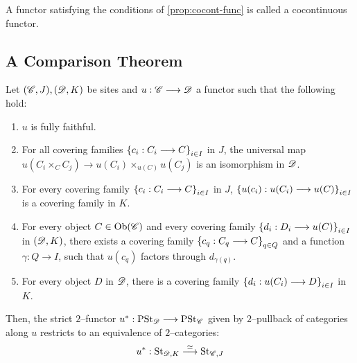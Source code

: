 \documentclass[11pt]{amsart}
\begin{document}
\begin{defn}
A functor satisfying the conditions of \cref{prop:cocont-func} is called a cocontinuous functor.
\end{defn}

\subsection{A Comparison Theorem}
\label{subsec:comp-thm}

\begin{thm}\label{thm:comp-thm}
Let $(\mathscr{C}, J), (\mathscr{D}, K)$ be sites and $u : \sC \to \sD$ a functor such that
the following hold:
\begin{enumerate}
\item $u$ is fully faithful.

\item For all covering families $\set{c_i : C_i \to C}_{i \in I}$ in $J$, the universal map
$u(C_i \times_C C_j) \to u(C_i) \times_{u(C)} u(C_j)$ is an isomorphism in $\mathscr{D}$.

\item For every covering family $\set{c_i : C_i \to C}_{i \in I}$ in $J$,
$\set{u(c_i) : u(C_i) \to u(C)}_{i \in I}$ is a covering family in $K$.

\item For every object $C \in \Ob{\sC}$ and every covering family
$\set{d_i : D_i \to u(C)}_{i \in I}$ in $(\mathscr{D}, K)$,
there exists a covering family $\set{c_q : C_q \to C}_{q \in Q}$ and a function
$\gamma : Q \to I$, such that $u(c_q)$ factors through $d_{\gamma(q)}$.

\item For every object $D$ in $\mathscr{D}$, there is a covering family
$\set{d_i : u(C_i) \to D}_{i \in I}$ in $K$.
\end{enumerate}
Then, the strict $2$--functor $u^* : \PSt_\sD \to \PSt_\sC$ given by $2$--pullback of categories
along $u$ restricts to an equivalence of $2$--categories:
\[
u^* : \St_{\sD, K} \to[\simeq] \St_{\sC, J}
\]
\end{thm}
\end{document}
